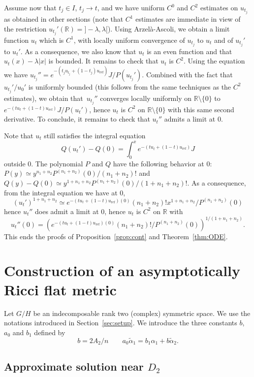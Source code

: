 \documentclass[JEP,XML,SOM,Unicode, NoEqCountersInSection, NoFloatCountersInSection]{cedram}
\theoremstyle{plain}
\theoremstyle{definition}
\begin{document}
Assume now that $t_j\in I$, $t_j\to t$, and we have uniform
$C^0$ and $C^2$ estimates on $u_{t_j}$ as obtained in other sections
(note that $C^1$ estimates are immediate in view of the restriction
$u_{t_j}'(\mathbb{R})={}]-\lambda,\lambda[$).
Using Arzelà-Ascoli, we obtain a limit function $u_t$ which is $C^1$,
with locally uniform convergence of $u_{t_j}$ to $u_t$ and of
$u_{t_j}'$ to $u_t'$. As a consequence, we also know that $u_t$ is an
even function and that $u_t(x)-\lambda |x|$ is bounded. It remains to
check that $u_t$ is $C^2$. Using the equation we have
$u_{t_j}''=e^{-(t_ju_{t_j}+(1-t_j)u_{\mathrm{ref}})}J/P(u_{t_j}')$.
Combined with the fact that $u_{t_j}'/u_0'$ is uniformly bounded (this
follows from the same techniques as the $C^2$ estimates), we obtain that~$u_{t_j}''$ converges locally uniformly on $\mathbb{R}\setminus \{0\}$ to
$e^{-(tu_t+(1-t)u_{\mathrm{ref}})}J/P(u_t')$, hence $u_t$ is $C^2$ on
$\mathbb{R}\setminus \{0\}$ with this same second derivative.
To conclude, it remains to check that $u_t''$ admits a limit at $0$.

Note that $u_t$ still satisfies the integral equation
\[ Q(u_t')-Q(0)=\int_0^xe^{-(tu_t+(1-t)u_{\mathrm{ref}})}J \]
outside $0$.
The polynomial $P$ and $Q$ have the following behavior at $0$:
$P(y)\simeq y^{n_1+n_2}P^{(n_1+n_2)}(0)/(n_1+n_2)!$ and
$Q(y)-Q(0)\simeq y^{1+n_1+n_2}P^{(n_1+n_2)}(0)/(1+n_1+n_2)!$.
As a consequence, from the integral equation we have at $0$,
\[ (u_t')^{1+n_1+n_2}\simeq e^{-(tu_t+(1-t)u_{\mathrm{ref}})(0)}(n_1+n_2)!x^{1+n_1+n_2}/P^{(n_1+n_2)}(0) \]
hence $u_t''$ does admit a limit at $0$, hence $u_t$ is $C^2$
on $\mathbb{R}$ with
\[ u_t''(0)=\left(e^{-(tu_t+(1-t)u_{\mathrm{ref}})(0)}(n_1+n_2)!/P^{(n_1+n_2)}(0)\right)^{1/(1+n_1+n_2)}. \]
This ends the proofs of Proposition~\ref{prop:cont} and Theorem~\ref{thm:ODE}.

\section{Construction of an asymptotically Ricci flat metric}
\label{sec:constr-an-asympt}

Let $G/H$ be an indecomposable rank two (complex) symmetric space. We use the notations introduced in Section~\ref{sec:setup}.
We introduce the three constants $b$, $a_0$ and $b_1$ defined by
\[ b=2A_2/n \qquad a_0\tilde{\alpha}_1=b_1\alpha_1+b\tilde{\alpha}_2. \]

\subsection{Approximate solution near $D_2$}
\label{sec:appr-solut-near}
\end{document}

